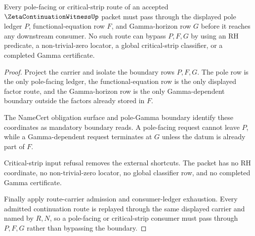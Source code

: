 \begin{theorem}
\label{thm:zeta-continuation-witness-critical-strip-pole-boundary}
Every pole-facing or critical-strip route of an accepted $\ZetaContinuationWitnessUp$ packet must pass through the displayed pole ledger $P$, functional-equation row $F$, and Gamma-horizon row $G$ before it reaches any downstream consumer. No such route can bypass $P,F,G$ by using an RH predicate, a non-trivial-zero locator, a global critical-strip classifier, or a completed Gamma certificate.
\end{theorem}
\begin{proof}
Project the carrier and isolate the boundary rows $P,F,G$. The pole row is the only pole-facing ledger, the functional-equation row is the only displayed factor route, and the Gamma-horizon row is the only Gamma-dependent boundary outside the factors already stored in $F$.

The NameCert obligation surface and pole-Gamma boundary identify these coordinates as mandatory boundary reads. A pole-facing request cannot leave $P$, while a Gamma-dependent request terminates at $G$ unless the datum is already part of $F$.

Critical-strip input refusal removes the external shortcuts. The packet has no RH coordinate, no non-trivial-zero locator, no global classifier row, and no completed Gamma certificate.

Finally apply route-carrier admission and consumer-ledger exhaustion. Every admitted continuation route is replayed through the same displayed carrier and named by $R,N$, so a pole-facing or critical-strip consumer must pass through $P,F,G$ rather than bypassing the boundary.
\end{proof}

